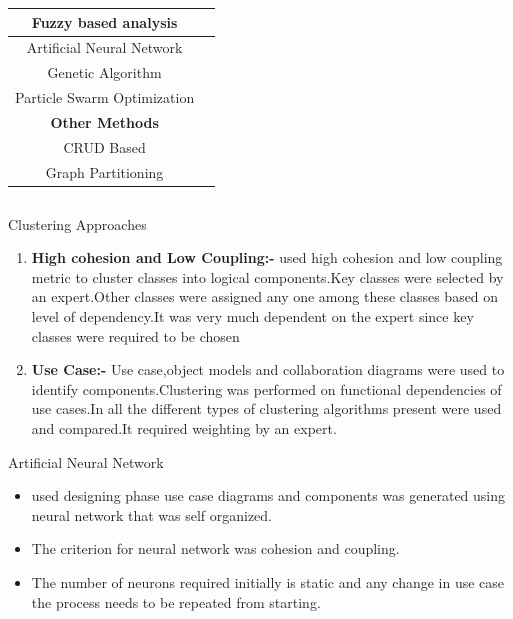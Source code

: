 \documentclass{beamer}
\begin{document}
\begin{frame}
\begin{columns}
\begin{column}{0.5\textwidth}
\begin{table}
\begin{adjustbox}{width=\columnwidth,center}
\begin{tabular}{|c c |}
					\hline
					Fuzzy based analysis & \cite{fuzzy}  \\ [0.5ex]
					\hline
					Artificial Neural Network  & \cite{neural} \\
					\hline
					Genetic Algorithm & \cite{genetic}  \\
					\hline
					Particle Swarm Optimization & \cite{pso}\cite{pso1}  \\ [1ex] 
					\hline
					\textbf{Other Methods} &   \\
					\hline
					CRUD Based & \cite{CRUD}  \\ 
					\hline
					Graph Partitioning & \cite{graphPartion}  \\ 
					\hline
				\end{tabular}
			\end{adjustbox}
		\end{table}
	\end{column}
	\end{columns}
\end{frame}
\begin{frame}{Clustering Approaches}
\begin{enumerate}
	\item \textbf{High cohesion and Low Coupling:-}\cite{highCohesionLowCoupling} used high cohesion and low coupling metric to cluster classes into logical components.Key classes were selected by an expert.Other classes were assigned any one among these classes based on level of dependency.It was very much dependent on the expert since key classes were required to be chosen
	\item \textbf{Use Case:-} Use case,object models and collaboration diagrams were used to identify components.Clustering was performed on functional dependencies of use cases.In \cite{KMeans}\cite{agglomerative} all the different types of clustering algorithms present were used and compared.It required weighting by an expert\cite{clusteringAna}.
\end{enumerate}
\end{frame}
\begin{frame}[allowframebreaks]{Artificial Neural Network}
	\begin{itemize}
		\item \cite{neural} used designing phase use case diagrams and components was generated using neural network that was self organized.
		\item The criterion for neural network was cohesion and coupling.
		
		\item The number of neurons required initially is static and any change in use case the process needs to be repeated from starting.
	\end{itemize}
	 
\end{frame}
\end{document}

